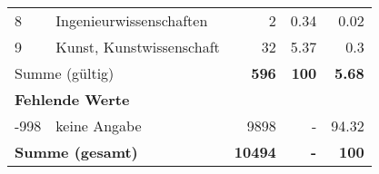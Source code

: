 \begin{longtable}{lXrrr}
     8 &
     \multicolumn{1}{X}{ Ingenieurwissenschaften   } &


       \num{2} &
       \num[round-mode=places,round-precision=2]{0,34} &
         \num[round-mode=places,round-precision=2]{0,02} \\

     9 &
     \multicolumn{1}{X}{ Kunst, Kunstwissenschaft   } &


       \num{32} &
       \num[round-mode=places,round-precision=2]{5,37} &
         \num[round-mode=places,round-precision=2]{0,3} \\
     \midrule
     \multicolumn{2}{l}{Summe (gültig)} &
       \textbf{\num{596}} &
     \textbf{100} &
       \textbf{\num[round-mode=places,round-precision=2]{5,68}} \\
     \multicolumn{5}{l}{\textbf{Fehlende Werte}}\\
       -998 &
       keine Angabe &
         \num{9898} &
        - &
         \num[round-mode=places,round-precision=2]{94,32} \\
     \midrule
     \multicolumn{2}{l}{\textbf{Summe (gesamt)}} &
          \textbf{\num{10494}} &
        \textbf{-} &
        \textbf{100} \\
     \bottomrule
     \end{longtable}
     
